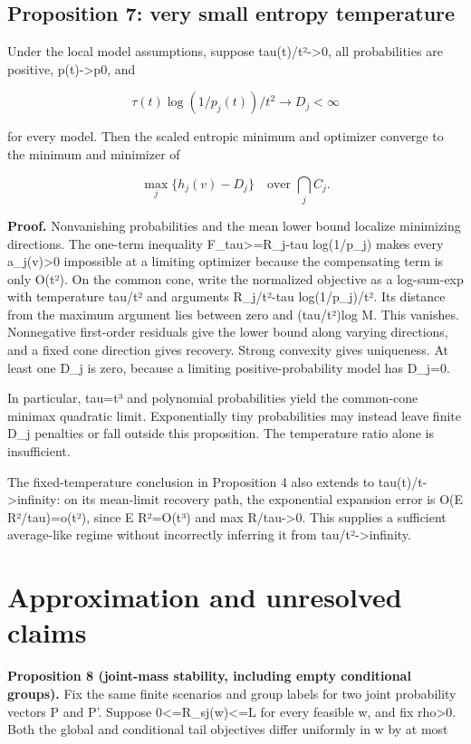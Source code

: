 \documentclass[10pt]{article}
\begin{document}
\subsection*{Proposition 7: very small entropy temperature}

Under the local model assumptions, suppose tau(t)/t²->0, all probabilities are positive, p(t)->p0, and

\[
\tau(t)\log(1/p_j(t))/t^2\to D_j<\infty
\]



for every model. Then the scaled entropic minimum and optimizer converge to the minimum and minimizer of

\begin{equation}
\max_j\{h_j(v)-D_j\}\quad\text{over }\bigcap_j C_j.\tag{14}
\end{equation}



\textbf{Proof.} Nonvanishing probabilities and the mean lower bound localize minimizing directions. The one-term inequality F\_tau>=R\_j-tau log(1/p\_j) makes every a\_j(v)>0 impossible at a limiting optimizer because the compensating term is only O(t²). On the common cone, write the normalized objective as a log-sum-exp with temperature tau/t² and arguments R\_j/t²-tau log(1/p\_j)/t². Its distance from the maximum argument lies between zero and (tau/t²)log M. This vanishes. Nonnegative first-order residuals give the lower bound along varying directions, and a fixed cone direction gives recovery. Strong convexity gives uniqueness. At least one D\_j is zero, because a limiting positive-probability model has D\_j=0.

In particular, tau=t³ and polynomial probabilities yield the common-cone minimax quadratic limit. Exponentially tiny probabilities may instead leave finite D\_j penalties or fall outside this proposition. The temperature ratio alone is insufficient.

The fixed-temperature conclusion in Proposition 4 also extends to tau(t)/t->infinity: on its mean-limit recovery path, the exponential expansion error is O(E R²/tau)=o(t²), since E R²=O(t³) and max R/tau->0. This supplies a sufficient average-like regime without incorrectly inferring it from tau/t²->infinity.

\section{Approximation and unresolved claims}

\textbf{Proposition 8 (joint-mass stability, including empty conditional groups).} Fix the same finite scenarios and group labels for two joint probability vectors P and P'. Suppose 0<=R\_sj(w)<=L for every feasible w, and fix rho>0. Both the global and conditional tail objectives differ uniformly in w by at most
\end{document}
